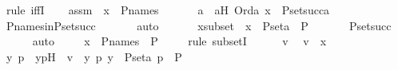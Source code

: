 \begin{isabellebody}
%
\isatagproof
{}\isamarkupfalse%
\ {\isacharparenleft}{\kern0pt}rule\ iffI{\isacharparenright}{\kern0pt}\isanewline
\ \ \isamarkupfalse%
\ assm\ {\isacharcolon}{\kern0pt}\ {\isachardoublequoteopen}x\ {\isasymin}\ P{\isacharunderscore}{\kern0pt}names{\isachardoublequoteclose}\ \isanewline
\ \ \isamarkupfalse%
\ \isamarkupfalse%
\ a\ \ aH{\isacharcolon}{\kern0pt}\ {\isachardoublequoteopen}Ord{\isacharparenleft}{\kern0pt}a{\isacharparenright}{\kern0pt}{\isachardoublequoteclose}\ {\isachardoublequoteopen}x\ {\isasymin}\ P{\isacharunderscore}{\kern0pt}set{\isacharparenleft}{\kern0pt}succ{\isacharparenleft}{\kern0pt}a{\isacharparenright}{\kern0pt}{\isacharparenright}{\kern0pt}{\isachardoublequoteclose}\ \isanewline
\ \ \ \ \isamarkupfalse%
\ P{\isacharunderscore}{\kern0pt}names{\isacharunderscore}{\kern0pt}in{\isacharunderscore}{\kern0pt}P{\isacharunderscore}{\kern0pt}set{\isacharunderscore}{\kern0pt}succ\ \isanewline
\ \ \ \ \isamarkupfalse%
\ auto\ \isanewline
\ \ \isamarkupfalse%
\ \isamarkupfalse%
\ xsubset\ {\isacharcolon}{\kern0pt}\ {\isachardoublequoteopen}x\ {\isasymsubseteq}\ P{\isacharunderscore}{\kern0pt}set{\isacharparenleft}{\kern0pt}a{\isacharparenright}{\kern0pt}\ {\isasymtimes}\ P{\isachardoublequoteclose}\ \isanewline
\ \ \ \ \isamarkupfalse%
\ P{\isacharunderscore}{\kern0pt}set{\isacharunderscore}{\kern0pt}succ\ \isanewline
\ \ \ \ \isamarkupfalse%
\ auto\ \isanewline
\ \ \isamarkupfalse%
\ {\isachardoublequoteopen}x\ {\isasymsubseteq}\ P{\isacharunderscore}{\kern0pt}names\ {\isasymtimes}\ P{\isachardoublequoteclose}\ \isanewline
\ \ \isamarkupfalse%
\ {\isacharparenleft}{\kern0pt}rule\ subsetI{\isacharparenright}{\kern0pt}\isanewline
\ \ \ \ \isamarkupfalse%
\ v\ \isamarkupfalse%
\ {\isachardoublequoteopen}v\ {\isasymin}\ x{\isachardoublequoteclose}\ \isanewline
\ \ \ \ \isamarkupfalse%
\ \isamarkupfalse%
\ y\ p\ \ ypH\ {\isacharcolon}{\kern0pt}\ {\isachardoublequoteopen}v\ {\isacharequal}{\kern0pt}\ {\isacharless}{\kern0pt}y{\isacharcomma}{\kern0pt}\ p{\isachargreater}{\kern0pt}{\isachardoublequoteclose}\ {\isachardoublequoteopen}y\ {\isasymin}\ P{\isacharunderscore}{\kern0pt}set{\isacharparenleft}{\kern0pt}a{\isacharparenright}{\kern0pt}{\isachardoublequoteclose}\ {\isachardoublequoteopen}p\ {\isasymin}\ P{\isachardoublequoteclose}\ \isamarkupfalse%

\end{isabellebody}
